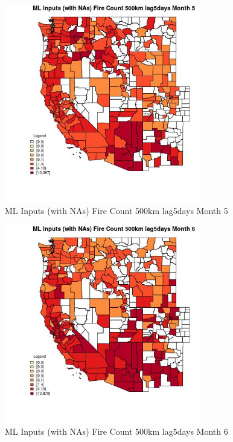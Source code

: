 \clearpage 

\begin{figure} 
\centering  
\includegraphics[width=0.77\textwidth]{Code_Outputs/Report_ML_input_PM25_Step4_part_e_de_duplicated_aves_compiled_2019-05-21wNAs_CountyFire_Count_500km_lag5daysmedianMonth5.jpg} 
\caption{\label{fig:Report_ML_input_PM25_Step4_part_e_de_duplicated_aves_compiled_2019-05-21wNAsCountyFire_Count_500km_lag5daysmedianMonth5}ML Inputs (with NAs) Fire Count 500km lag5days Month 5} 
\end{figure} 
 

\begin{figure} 
\centering  
\includegraphics[width=0.77\textwidth]{Code_Outputs/Report_ML_input_PM25_Step4_part_e_de_duplicated_aves_compiled_2019-05-21wNAs_CountyFire_Count_500km_lag5daysmedianMonth6.jpg} 
\caption{\label{fig:Report_ML_input_PM25_Step4_part_e_de_duplicated_aves_compiled_2019-05-21wNAsCountyFire_Count_500km_lag5daysmedianMonth6}ML Inputs (with NAs) Fire Count 500km lag5days Month 6} 
\end{figure} 
 

